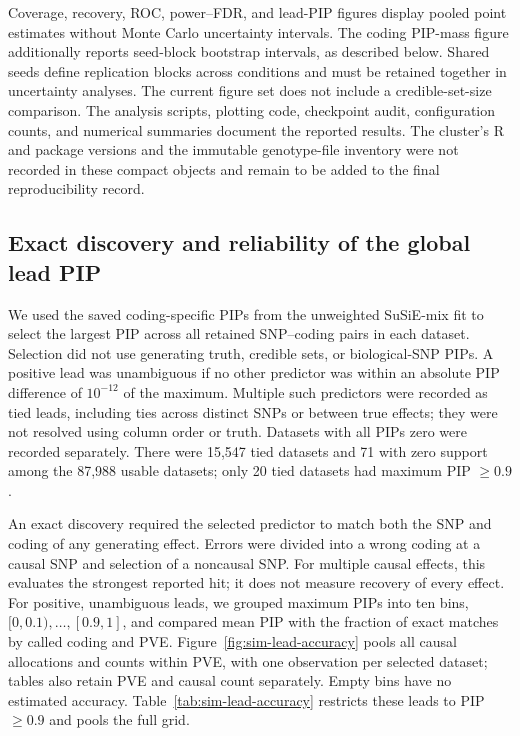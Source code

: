 \documentclass[12pt]{article}
\begin{document}
Coverage, recovery, ROC, power--FDR, and lead-PIP figures display
pooled point estimates without Monte Carlo uncertainty intervals.
The coding PIP-mass figure additionally reports seed-block bootstrap
intervals, as described below. Shared seeds define replication blocks
across conditions and must be retained together in uncertainty analyses.
The current figure set does not include a credible-set-size comparison.
The analysis scripts, plotting code, checkpoint audit, configuration
counts, and numerical summaries document the reported results. The
cluster's R and package versions and the immutable genotype-file
inventory were not recorded in these compact objects and remain to be
added to the final reproducibility record.

\subsection{Exact discovery and reliability of the global lead PIP}

We used the saved coding-specific PIPs from the unweighted
SuSiE-mix fit to select the largest PIP across all retained SNP--coding
pairs in each dataset. Selection did not use generating truth, credible
sets, or biological-SNP PIPs. A positive lead was unambiguous if no
other predictor was within an absolute PIP difference of $10^{-12}$
of the maximum. Multiple such predictors were recorded as tied leads,
including ties across distinct SNPs or between true effects; they were
not resolved using column order or truth. Datasets with all PIPs zero
were recorded separately. There were 15,547 tied datasets and 71 with
zero support among the 87,988 usable datasets; only 20 tied datasets
had maximum PIP $\geq 0.9$.

An exact discovery required the selected predictor to match
both the SNP and coding of any generating effect. Errors were divided
into a wrong coding at a causal SNP and selection of a noncausal SNP.
For multiple causal effects, this evaluates the strongest reported hit;
it does not measure recovery of every effect. For positive, unambiguous
leads, we grouped maximum PIPs into ten bins, $[0,0.1),\ldots,[0.9,1]$,
and compared mean PIP with the fraction of exact matches by called
coding and PVE. Figure~\ref{fig:sim-lead-accuracy} pools all causal
allocations and counts within PVE, with one observation per selected
dataset; tables also retain PVE and causal count separately. Empty
bins have no estimated accuracy. Table~\ref{tab:sim-lead-accuracy}
restricts these leads to PIP $\geq 0.9$ and pools the full grid.
\end{document}
